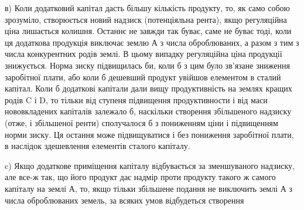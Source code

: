 в) Коли додатковий капітал дасть більшу кількість продукту, то, як само
собою зрозуміло, створюється новий надзиск (потенціяльна рента), якщо регуляційна
ціна лишається колишня. Останнє не завжди так буває, саме не буває
тоді, коли ця додаткова продукція виключає землю А з числа оброблюваних, а
разом з тим з числа конкурентних родів землі. В цьому випадку регуляційна ціна
продукції знижується. Норма зиску підвищилась би, коли б з цим було зв’язане
зниження заробітної плати, або коли б дешевший продукт увійшов елементом
в сталий капітал. Коли б додаткові капітали дали вищу продуктивність на
землях кращих родів C і D, то тільки від ступеня підвищення продуктивности
і від маси нововкладених капіталів залежало б, наскільки створення збільшеного
надзиску (отже, і збільшеної ренти) сполучалося б з пониженням ціни і підвищенням
норми зиску. Ця остання може підвищуватися і без пониження заробітної
плати, в наслідок здешевлення елементів сталого капіталу.

c) Якщо додаткове приміщення капіталу відбувається за зменшуваного
надзиску, але все-ж так, що його продукт дає надмір проти продукту такого ж
самого капіталу на землі А, то, якщо тільки збільшене подання не виключить
землі А з числа оброблюваних земель, за всяких умов відбудеться створення
\parbreak{}  %
